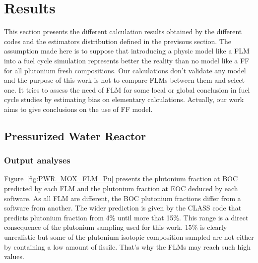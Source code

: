 
\section{Results}
This section presents the different calculation results obtained by the different codes and the estimators distribution defined in the previsous section. The assumption made here is to suppose that introducing a physic model like a FLM into a fuel cycle simulation represents better the reality than no model like a FF for all plutonium fresh compositions. Our calculations don't validate any model and the purpose of this work is not to compare FLMs between them and select one. It tries to assess the need of FLM for some local or global conclusion in fuel cycle studies by estimating bias on elementary calculations. Actually, our work aims to give conclusions on the use of FF model.   


\subsection{Pressurized Water Reactor}

\subsubsection{Output analyses}
Figure~\ref{fig:PWR_MOX_FLM_Pu} presents the plutonium fraction at BOC predicted by each FLM and the plutonium fraction at EOC deduced by each software. As all FLM are different, the BOC plutonium fractions differ from a software from another. The wider prediction is given by the CLASS code that predicts plutonium fraction from 4\% until more that 15\%. This range is a direct consequence of the plutonium sampling used for this work. 15\% is clearly unrealistic but some of the plutonium isotopic composition sampled are not either by containing a low amount of fissile. That's why the FLMs may reach such high values.    

